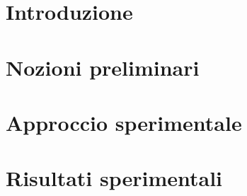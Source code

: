 \documentclass[a4paper,12pt]{book}
\begin{document}

\thispagestyle{empty} %
\cleardoublepage

\thispagestyle{empty}

\clearpage{\pagestyle{plain}\cleardoublepage}
\tableofcontents %

\clearpage{\pagestyle{plain}\cleardoublepage} %

\clearpage{\pagestyle{plain}\cleardoublepage} %
\chapter{Introduzione} %
\label{chapter:zero} %

\clearpage{\pagestyle{plain}\cleardoublepage} %
\chapter{Nozioni preliminari} %
\label{chapter:primo} %

\clearpage{\pagestyle{plain}\cleardoublepage} %
\chapter{Approccio sperimentale} %
\label{chapter:secondo} %

\clearpage{\pagestyle{plain}\cleardoublepage} %
\chapter{Risultati sperimentali} %
\label{chapter:terzo} %

\clearpage{\pagestyle{plain}\cleardoublepage} %
\end{document}
